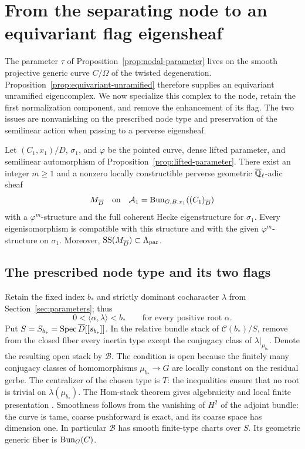 \section{From the separating node to an equivariant flag eigensheaf}
\label{sec:nodal}

The parameter $\tau$ of Proposition~\ref{prop:nodal-parameter} lives on
the smooth projective generic curve $C/\Omega$ of the twisted
degeneration.  Proposition~\ref{prop:equivariant-unramified} therefore
supplies an equivariant unramified eigencomplex.  We now specialize
this complex to the node, retain the first normalization component,
and remove the enhancement of its flag.  The two issues are
nonvanishing on the prescribed node type and preservation of the
semilinear action when passing to a perverse eigensheaf.

\begin{proposition}\label{prop:charzero-equivariant}
Let $(C_1,x_1)/D$, $\sigma_1$, and $\varphi$ be the pointed curve,
dense lifted parameter, and semilinear automorphism of
Proposition~\ref{prop:lifted-parameter}.  There exist an integer
$m\geq 1$ and a nonzero locally constructible perverse geometric
$\overline{\mathbb Q}_{\ell}$-adic sheaf
\[
 M_{\overline D}\quad\text{on}\quad
 \mathcal A_1=\operatorname{Bun}_{G,B,x_1}((C_1)_{\overline D})
\]
with a $\varphi^m$-structure and the full coherent Hecke eigenstructure
for $\sigma_1$.  Every eigenisomorphism is compatible with this
structure and with the given $\varphi^m$-structure on $\sigma_1$.
Moreover, $\operatorname{SS}(M_{\overline D})\subset\Lambda_{\mathrm{par}}$.
\end{proposition}

\subsection{The prescribed node type and its two flags}

Retain the fixed index $b_*$ and strictly dominant cocharacter
$\lambda$ from Section~\ref{sec:parameters}; thus
\[
 0<\langle\alpha,\lambda\rangle<b_*
 \qquad\text{for every positive root }\alpha.
\]
Put $S=S_{b_*}=\operatorname{Spec}\overline D[[s_{b_*}]]$.  In the relative bundle stack
of $\mathcal C(b_*)/S$, remove from the closed fiber every inertia
type except the conjugacy class of $\lambda|_{\mu_{b_*}}$.  Denote
the resulting open stack by $\mathcal B$.  The condition is open
because the finitely many conjugacy classes of homomorphisms
$\mu_{b_*}\to G$ are locally constant on the residual gerbe.
The centralizer of the chosen type is $T$: the inequalities ensure
that no root is trivial on $\lambda(\mu_{b_*})$.
The Hom-stack theorem gives algebraicity and local finite
presentation \cite[Theorem~1.2]{HallRydh}.  Smoothness follows from
the vanishing of $H^2$ of the adjoint bundle: the curve is tame,
coarse pushforward is exact, and its coarse space has dimension one.
In particular $\mathcal B$ has smooth finite-type charts over $S$.
Its geometric generic fiber is $\operatorname{Bun}_G(C)$.

